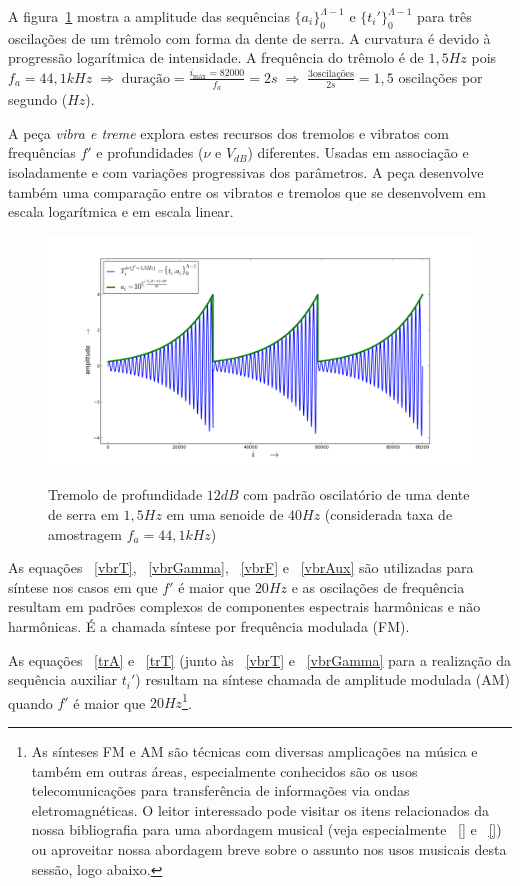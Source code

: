 A figura~\ref{fig:tremolo} mostra a amplitude das sequências $\{a_i\}_0^{\Lambda-1}$ e $\{t_i'\}_0^{\Lambda-1}$
para três oscilações de um trêmolo com forma da dente de serra. A curvatura é devido à progressão logarítmica de
intensidade. A frequência do trêmolo é de $1,5Hz$ pois $f_a=44,1kHz \; \Rightarrow \; \text{duração} = \frac{i_{\text{máx}}=82000}{f_a}= 2s \; \Rightarrow \; \frac{3\text{oscilações}}{2s}=1,5$ oscilações por segundo ($Hz$). 

A peça \emph{vibra e treme} explora estes recursos dos tremolos e vibratos
com frequências $f'$
e profundidades ($\nu$ e $V_{dB}$) diferentes. Usadas em associação e isoladamente e com variações progressivas dos parâmetros. A peça desenvolve também uma comparação entre os vibratos e tremolos que se desenvolvem em escala logarítmica e em escala linear.


\begin{figure}[h!]
    \centering
    \caption{Tremolo de profundidade $12dB$ com padrão oscilatório de uma dente de serra em $1,5Hz$ em uma senoide de $40Hz$ (considerada taxa de amostragem $f_a=44,1kHz$)}
        \includegraphics[width=\textwidth]{figuras/tremolo}
        \label{fig:tremolo}
\end{figure}

As equações ~\ref{vbrT}, ~\ref{vbrGamma}, ~\ref{vbrF} e ~\ref{vbrAux}
são utilizadas para síntese nos casos em que $f'$ é
maior que $20Hz$ e as oscilações de frequência resultam em padrões complexos
de componentes espectrais harmônicas e não harmônicas. É a chamada síntese
por frequência modulada (FM).

As equações ~\ref{trA} e ~\ref{trT}
(junto às ~\ref{vbrT} e ~\ref{vbrGamma} para a realização da sequência auxiliar $t_i'$) 
resultam na síntese chamada de amplitude modulada (AM)
quando $f'$ é maior que $20Hz$\footnote{As sínteses
FM e AM são técnicas com diversas amplicações na música e também em outras áreas,
especialmente conhecidos são os usos telecomunicações para transferência de informações
via ondas eletromagnéticas. O leitor interessado pode visitar os itens relacionados
da nossa bibliografia para uma abordagem musical (veja especialmente ~\ref{} e ~\ref{})
ou aproveitar nossa abordagem breve sobre o assunto nos usos musicais desta sessão, logo abaixo.}.

